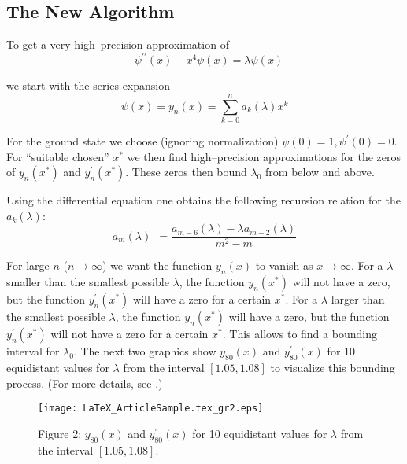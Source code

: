 \documentclass{article}
\begin{document}
\subsection{The New Algorithm}

\noindent To get a very high--precision approximation of\ \ 
\begin{equation}
-\psi ^{{\prime\prime}}( x) +x^{4}\psi ( x) =\lambda  \psi ( x)
\end{equation}

\noindent we start with the series expansion 
\begin{equation}
\psi ( x) =y_{n}( x) =\sum \limits_{k=0}^{n}a_{k}( \lambda ) x^{k}
\end{equation}

For the ground state we choose (ignoring normalization) $\psi (
0) =1, \psi ^{\prime }( 0) =0$. For ``suitable chosen'' $x^{*}$
we then find high--precision approximations for the zeros of $y_{n}(
x^{*}) $ and $y_{n}^{\prime }( x^{*}) $. These zeros then bound
$\lambda _{0}$ from below and above. \ \ 

Using the differential equation one obtains the following recursion
relation for the $a_{k}( \lambda ) $:
\begin{equation}
a_{m}( \lambda ) \ \ =\frac{a_{m-6}( \lambda ) -\lambda  a_{m-2}(
\lambda ) }{m^{2}-m}
\end{equation}

For large $n$ ($n\rightarrow \infty $) we want the function $y_{n}(
x) $ to vanish as $x\rightarrow \infty $. For a $\lambda$ smaller
than the smallest possible $\lambda$, the function $y_{n}( x^{*})
$ will not have a zero, but the function $y_{n}^{\prime }( x^{*})
$ will have a zero for a certain $x^{*}$. For a $\lambda$ larger
than the smallest possible $\lambda$, the function $y_{n}( x^{*})
$ will have a zero, but the function $y_{n}^{\prime }( x^{*}) $
will not have a zero for a certain $x^{*}$. This allows to find
a bounding interval for $\lambda _{0}$. The next two graphics show
$y_{80}( x) $ and $y_{80}^{\prime }( x) $ for 10 equidistant values
for $\lambda$ from the interval $[1.05,1.08]$ to visualize this
bounding process. (For more details, see \cite{Trott00A}.)
\begin{figure}[h]
\begin{center}
\texttt{[image: LaTeX\_ArticleSample.tex\_gr2.eps]}

\end{center}
\caption{Figure 2: $y_{80}( x) $ and $y_{80}^{\prime }( x) $ for
10 equidistant values for $\lambda$ from the interval $[1.05,1.08]$.}
\end{figure}
\end{document}
